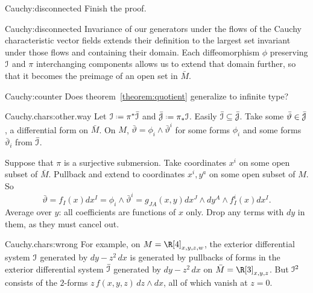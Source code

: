\begin{problem}{Cauchy:disconnected}
Finish the proof.
\end{problem}
\begin{answer}{Cauchy:disconnected}
Invariance of our generators under the flows of the Cauchy characteristic vector fields extends their definition to the largest set invariant under those flows and containing their domain.
Each diffeomorphism \(\phi\) preserving \(\mathcal{I}\) and \(\pi\) interchanging components allows us to extend that domain further, so that it becomes the preimage of an open set in \(\bar{M}\).
\end{answer}
\begin{problem}{Cauchy:counter}
Does theorem~\vref{theorem:quotient} generalize to infinite type?
\end{problem}
\begin{answer}{Cauchy.chars:other.way}
Let \(\II\defeq\pi^*\bar\II\) and \(\bar\JJ\defeq\pi_*\II\).
Easily \(\bar{\mathcal{I}}\subseteq\bar{\mathcal{J}}\).
Take some \(\bar\vartheta\in\bar{\mathcal{J}}\), a differential form on \(\bar{M}\).
On \(M\), \(\bar\vartheta=\phi_i\wedge\bar\vartheta^i\) for some forms \(\phi_i\) and some forms \(\bar\vartheta_i\) from \(\bar{\mathcal{I}}\).

Suppose that \(\pi\) is a surjective submersion.
Take coordinates \(x^i\) on some open subset of \(\bar{M}\).
Pullback and extend to coordinates \(x^i,y^a\) on some open subset of \(M\).
So
\[
\bar\vartheta=f_I(x)dx^I=\phi_i\wedge\bar\vartheta^i=g_{JA}(x,y)dx^J\wedge dy^A\wedge f^i_I(x)dx^I.
\]
Average over \(y\): all coefficients are functions of \(x\) only.
Drop any terms with \(dy\) in them, as they must cancel out.
\end{answer}
\begin{answer}{Cauchy.chars:wrong}
For example, on \(M=\R[4]_{x,y,z,w}\), the exterior differential system \(\mathcal{I}\) generated by \(dy-z^2 \, dx\) is generated by pullbacks of forms in the exterior differential system \(\bar{\mathcal{I}}\) generated by \(dy-z^2 \, dx\) on \(\bar{M}=\R[3]_{x,y,z}\).
But \(\mathcal{I}^2\) consists of the \(2\)-forms \(z \, f(x,y,z) \, dz \wedge dx\), all of which vanish at \(z=0\).
\end{answer}
